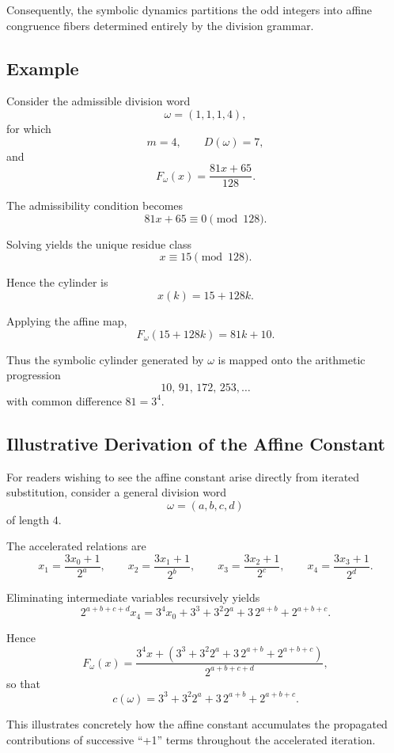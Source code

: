 \documentclass[12pt, oneside]{article}
\numberwithin{equation}{section}
\theoremstyle{definition}
\theoremstyle{plain}
\theoremstyle{remark}
\begin{document}
Consequently, the symbolic dynamics partitions the odd integers into
affine congruence fibers determined entirely by the division grammar.


\subsection{Example}

Consider the admissible division word
\[
\omega=(1,1,1,4),
\]
for which
\[
m=4,
\qquad
D(\omega)=7,
\]
and
\[
F_\omega(x)=\frac{81x+65}{128}.
\]

The admissibility condition becomes
\[
81x+65\equiv0\pmod{128}.
\]

Solving yields the unique residue class
\[
x\equiv15\pmod{128}.
\]

Hence the cylinder is
\[
x(k)=15+128k.
\]

Applying the affine map,
\[
F_\omega(15+128k)
=
81k+10.
\]

Thus the symbolic cylinder generated by \(\omega\) is mapped onto the
arithmetic progression
\[
10,\,91,\,172,\,253,\dots
\]
with common difference \(81=3^4\).


\subsection{Illustrative Derivation of the Affine Constant}

For readers wishing to see the affine constant arise directly from
iterated substitution, consider a general division word
\[
\omega=(a,b,c,d)
\]
of length \(4\).

The accelerated relations are
\[
x_1=\frac{3x_0+1}{2^a},
\qquad
x_2=\frac{3x_1+1}{2^b},
\qquad
x_3=\frac{3x_2+1}{2^c},
\qquad
x_4=\frac{3x_3+1}{2^d}.
\]

Eliminating intermediate variables recursively yields
\[
2^{a+b+c+d}x_4
=
3^4x_0
+
3^3
+
3^2 2^a
+
3\,2^{a+b}
+
2^{a+b+c}.
\]

Hence
\[
F_\omega(x)
=
\frac{
3^4x
+
\left(
3^3
+
3^2 2^a
+
3\,2^{a+b}
+
2^{a+b+c}
\right)
}{
2^{a+b+c+d}
},
\]
so that
\[
c(\omega)
=
3^3
+
3^2 2^a
+
3\,2^{a+b}
+
2^{a+b+c}.
\]

This illustrates concretely how the affine constant accumulates the
propagated contributions of successive ``+1'' terms throughout the
accelerated iteration.
\end{document}
